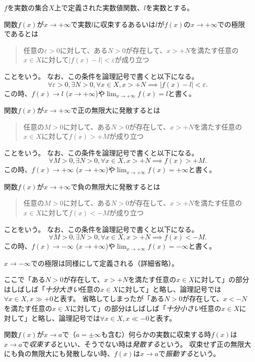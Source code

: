 \begin{definition}[関数の無限大での極限]
$f$を実数の集合$X$上で定義された実数値関数、$l$を実数とする。

関数$f(x)$が$x \to +\infty$で実数$l$に収束するあるいは$l$が$f(x)$の$x \to +\infty$での極限であるとは
\begin{quote}
任意の$\varepsilon > 0$に対して、ある$N > 0$が存在して、$x > +N$を満たす任意の$x \in X$に対して$|f(x)-l| < \varepsilon$が成り立つ
\end{quote}
ことをいう。
なお、この条件を論理記号で書くと以下になる。
$$
\forall \varepsilon > 0, \exists N > 0, \forall x \in X, x > +N \implies |f(x)-l| < \varepsilon.
$$
この時、$f(x) \to l$ ($x \to +\infty$)や$\lim_{x \to +\infty}f(x) = l$と書く。

関数$f(x)$が$x \to +\infty$で正の無限大に発散するとは
\begin{quote}
任意の$M > 0$に対して、ある$N > 0$が存在して、$x > +N$を満たす任意の$x \in X$に対して$f(x) > +M$が成り立つ
\end{quote}
ことをいう。
なお、この条件を論理記号で書くと以下になる。
$$
\forall M > 0, \exists N > 0, \forall x \in X, x > +N \implies f(x) > +M.
$$
この時、$f(x) \to +\infty$ ($x \to +\infty$)や$\lim_{x \to +\infty}f(x) = +\infty$と書く。

関数$f(x)$が$x \to +\infty$で負の無限大に発散するとは
\begin{quote}
任意の$M > 0$に対して、ある$N > 0$が存在して、$x > +N$を満たす任意の$x \in X$に対して$f(x) < -M$が成り立つ
\end{quote}
ことをいう。
なお、この条件を論理記号で書くと以下になる。
$$
\forall M > 0, \exists N > 0, \forall x \in X, x > +N \implies f(x) < -M.
$$
この時、$f(x) \to -\infty$ ($x \to +\infty$)や$\lim_{x \to +\infty}f(x) = -\infty$と書く。

$x \to -\infty$での極限は同様にして定義される（詳細省略）。
\end{definition}

ここで「ある$N > 0$が存在して、$x > +N$を満たす任意の$x \in X$に対して」の部分はしばしば「\emph{十分大きい}任意の$x \in X$に対して」と略し、論理記号では$\forall x \in X, x \gg +0$と表す。
省略してしまったが「ある$N > 0$が存在して、$x < -N$を満たす任意の$x \in X$に対して」の部分はしばしば「\emph{十分小さい}任意の$x \in X$に対して」と略し、論理記号では$\forall x \in X, x \ll -0$と表す。

関数$f(x)$が$x \to a$で（$a = \pm \infty$も含む）何らかの実数に収束する時$f(x)$は$x \to a$で\emph{収束する}といい、そうでない時は\emph{発散する}という。
収束せず正の無限大にも負の無限大にも発散しない時、$f(x)$は$x \to a$で\emph{振動する}という。

